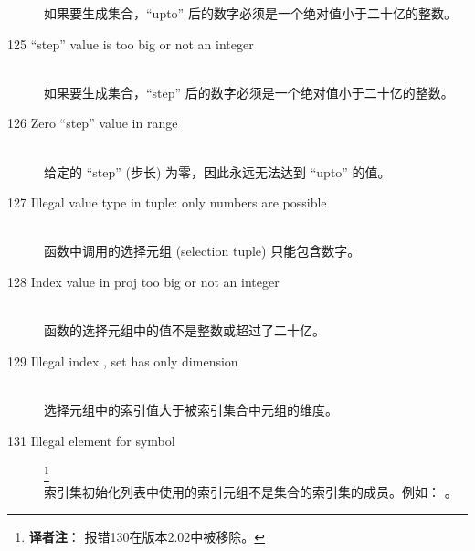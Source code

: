 \begin{description}
  如果要生成集合，``upto'' 后的数字必须是一个绝对值小于二十亿的整数。
\item[125 ``step'' value \code{xxx} is too big or not an integer]\ \\
  如果要生成集合，``step'' 后的数字必须是一个绝对值小于二十亿的整数。
\item[126 Zero ``step'' value in range]\ \\
  给定的 ``step'' (步长) 为零，因此永远无法达到 ``upto'' 的值。
\item[127 Illegal value type in tuple: \code{xxx} only numbers are
  possible]\ \\
  函数中调用的选择元组 (selection tuple) 只能包含数字。
\item[128 Index value \code{xxx} in proj too big or not an integer]\ \\
  函数的选择元组中的值不是整数或超过了二十亿。
\item[129 Illegal index \code{xxx}, set has only dimension \code{yyy}]\ \\
  选择元组中的索引值大于被索引集合中元组的维度。
\item[131 Illegal element \code{xxx} for symbol]\footnote{\textbf{译者注}：
    报错130在版本2.02中被移除。
  }\ \\
  索引集初始化列表中使用的索引元组不是集合的索引集的成员。例如：
  。

\end{description}
